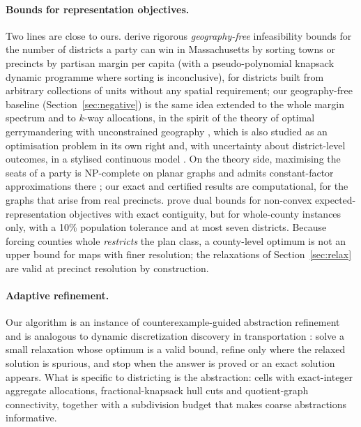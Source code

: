 \paragraph{Bounds for representation objectives.}
Two lines are close to ours. \citet{duchin2019} derive rigorous \emph{geography-free} infeasibility bounds for the number of districts a party can win in Massachusetts by sorting towns or precincts by partisan margin per capita (with a pseudo-polynomial knapsack dynamic programme where sorting is inconclusive), for districts built from arbitrary collections of units without any spatial requirement; our geography-free baseline (Section~\ref{sec:negative}) is the same idea extended to the whole margin spectrum and to $k$-way allocations, in the spirit of the theory of optimal gerrymandering with unconstrained geography \citep{owen1988,friedman2008}, which is also studied as an optimisation problem in its own right \citep{benade2021} and, with uncertainty about district-level outcomes, in a stylised continuous model \citep{lagarde2024}. On the theory side, maximising the seats of a party is NP-complete on planar graphs and admits constant-factor approximations there \citep{dippel2024}; our exact and certified results are computational, for the graphs that arise from real precincts. \citet{fravel2026} prove dual bounds for non-convex expected-representation objectives with exact contiguity, but for whole-county instances only, with a 10\% population tolerance and at most seven districts. Because forcing counties whole \emph{restricts} the plan class, a county-level optimum is not an upper bound for maps with finer resolution; the relaxations of Section~\ref{sec:relax} are valid at precinct resolution by construction.

\paragraph{Adaptive refinement.}
Our algorithm is an instance of counterexample-guided abstraction refinement \citep{clarke2003} and is analogous to dynamic discretization discovery in transportation \citep{boland2017,marshall2021}: solve a small relaxation whose optimum is a valid bound, refine only where the relaxed solution is spurious, and stop when the answer is proved or an exact solution appears. What is specific to districting is the abstraction: cells with exact-integer aggregate allocations, fractional-knapsack hull cuts and quotient-graph connectivity, together with a subdivision budget that makes coarse abstractions informative.
